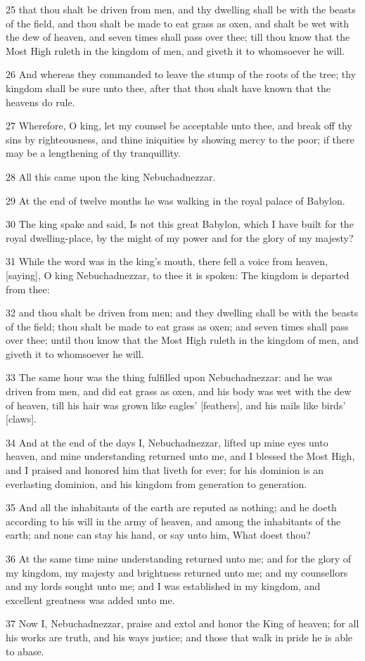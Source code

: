 \par 25 that thou shalt be driven from men, and thy dwelling shall be with the beasts of the field, and thou shalt be made to eat grass as oxen, and shalt be wet with the dew of heaven, and seven times shall pass over thee; till thou know that the Most High ruleth in the kingdom of men, and giveth it to whomsoever he will.
\par 26 And whereas they commanded to leave the stump of the roots of the tree; thy kingdom shall be sure unto thee, after that thou shalt have known that the heavens do rule.
\par 27 Wherefore, O king, let my counsel be acceptable unto thee, and break off thy sins by righteousness, and thine iniquities by showing mercy to the poor; if there may be a lengthening of thy tranquillity.
\par 28 All this came upon the king Nebuchadnezzar.
\par 29 At the end of twelve months he was walking in the royal palace of Babylon.
\par 30 The king spake and said, Is not this great Babylon, which I have built for the royal dwelling-place, by the might of my power and for the glory of my majesty?
\par 31 While the word was in the king's mouth, there fell a voice from heaven, [saying], O king Nebuchadnezzar, to thee it is spoken: The kingdom is departed from thee:
\par 32 and thou shalt be driven from men; and they dwelling shall be with the beasts of the field; thou shalt be made to eat grass as oxen; and seven times shall pass over thee; until thou know that the Most High ruleth in the kingdom of men, and giveth it to whomsoever he will.
\par 33 The same hour was the thing fulfilled upon Nebuchadnezzar: and he was driven from men, and did eat grass as oxen, and his body was wet with the dew of heaven, till his hair was grown like eagles' [feathers], and his nails like birds' [claws].
\par 34 And at the end of the days I, Nebuchadnezzar, lifted up mine eyes unto heaven, and mine understanding returned unto me, and I blessed the Most High, and I praised and honored him that liveth for ever; for his dominion is an everlasting dominion, and his kingdom from generation to generation.
\par 35 And all the inhabitants of the earth are reputed as nothing; and he doeth according to his will in the army of heaven, and among the inhabitants of the earth; and none can stay his hand, or say unto him, What doest thou?
\par 36 At the same time mine understanding returned unto me; and for the glory of my kingdom, my majesty and brightness returned unto me; and my counsellors and my lords sought unto me; and I was established in my kingdom, and excellent greatness was added unto me.
\par 37 Now I, Nebuchadnezzar, praise and extol and honor the King of heaven; for all his works are truth, and his ways justice; and those that walk in pride he is able to abase.

